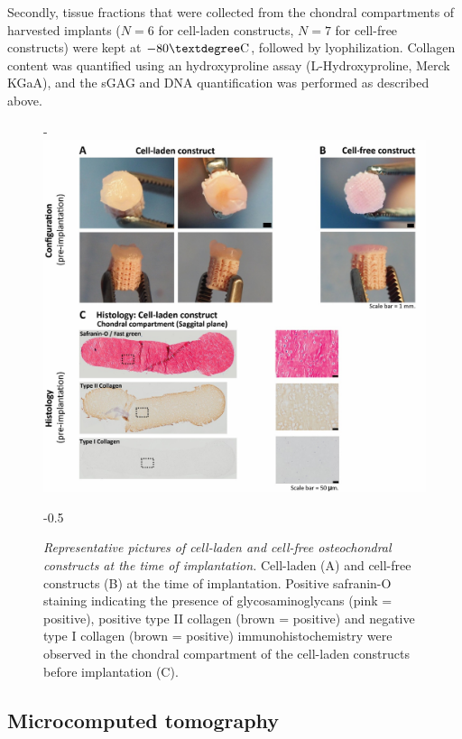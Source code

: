 \documentclass[twocolumn, empirical, authordate, issue]{jote-new-article}
\begin{document}
Secondly, tissue fractions that were collected from the chondral compartments of harvested implants ($ N=6 $ for cell-laden constructs, $ N=7 $ for cell-free constructs) were kept at $-80\textdegree \text{C}$, followed by lyophilization. Collagen content was quantified using an hydroxyproline assay (L-Hydroxyproline, Merck KGaA), and the sGAG and DNA quantification was performed as described above.
\begin{figure}[t!]
\captionsetup{width= \dimexpr\linewidth + \fullwidthlen\relax }
\begin{adjustwidth}{-\fullwidthlen}{}
 \includegraphics[width=.965\linewidth]{media/image4.jpg}
 \end{adjustwidth}
\begin{adjustwidth}{-0.5\fullwidthlen}{}
\caption{\emph{Representative pictures of cell-laden and cell-free osteochondral constructs at the time of implantation.} Cell-laden (A) and cell-free constructs (B) at the time of implantation. Positive safranin-O staining indicating the presence of glycosaminoglycans (pink = positive), positive type II collagen (brown = positive) and negative type I collagen (brown = positive) immunohistochemistry were observed in the chondral compartment of the cell-laden constructs before implantation (C).}
\label{fig:figure4}
\end{adjustwidth}
\end{figure}
\subsection{Microcomputed tomography} 
\end{document}
